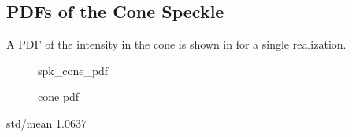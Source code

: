 \subsection{PDFs of the Cone Speckle}
A PDF of the intensity in the cone is shown in  for a
single realization.  
\begin{figure}[ht]
\centering
{spk_cone_pdf}
\caption{cone pdf}
\label{fig:conepdf}
\end{figure}

std/mean 1.0637

